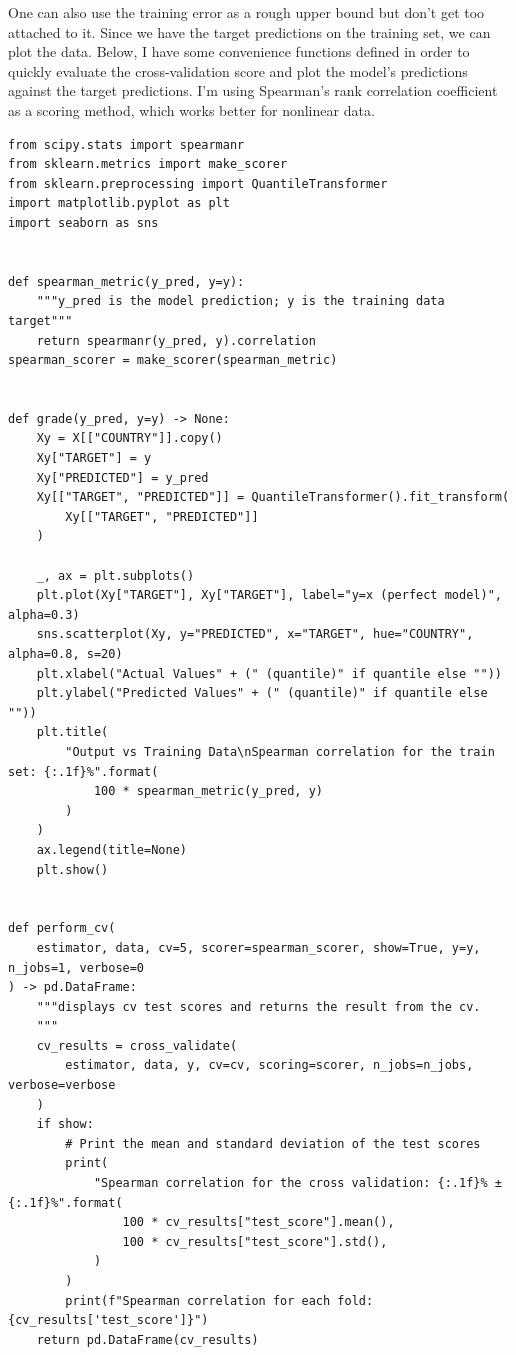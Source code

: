 \documentclass[11pt]{article}
\theoremstyle{definition}
\begin{document}
One can also use the training error as a rough upper bound but don't get too attached to it. Since we have the target predictions on the training set, we can plot the data. Below, I have some convenience functions defined in order to quickly evaluate the cross-validation score and plot the model's predictions against the target predictions. I'm using Spearman's rank correlation coefficient as a scoring method, which works better for nonlinear data.

\begin{verbatim}
from scipy.stats import spearmanr
from sklearn.metrics import make_scorer
from sklearn.preprocessing import QuantileTransformer
import matplotlib.pyplot as plt
import seaborn as sns


def spearman_metric(y_pred, y=y):
    """y_pred is the model prediction; y is the training data target"""
    return spearmanr(y_pred, y).correlation
spearman_scorer = make_scorer(spearman_metric)


def grade(y_pred, y=y) -> None:
    Xy = X[["COUNTRY"]].copy()
    Xy["TARGET"] = y
    Xy["PREDICTED"] = y_pred
    Xy[["TARGET", "PREDICTED"]] = QuantileTransformer().fit_transform(
        Xy[["TARGET", "PREDICTED"]]
    )

    _, ax = plt.subplots()
    plt.plot(Xy["TARGET"], Xy["TARGET"], label="y=x (perfect model)", alpha=0.3)
    sns.scatterplot(Xy, y="PREDICTED", x="TARGET", hue="COUNTRY", alpha=0.8, s=20)
    plt.xlabel("Actual Values" + (" (quantile)" if quantile else ""))
    plt.ylabel("Predicted Values" + (" (quantile)" if quantile else ""))
    plt.title(
        "Output vs Training Data\nSpearman correlation for the train set: {:.1f}%".format(
            100 * spearman_metric(y_pred, y)
        )
    )
    ax.legend(title=None)
    plt.show()


def perform_cv(
    estimator, data, cv=5, scorer=spearman_scorer, show=True, y=y, n_jobs=1, verbose=0
) -> pd.DataFrame:
    """displays cv test scores and returns the result from the cv.
    """
    cv_results = cross_validate(
        estimator, data, y, cv=cv, scoring=scorer, n_jobs=n_jobs, verbose=verbose
    )
    if show:
        # Print the mean and standard deviation of the test scores
        print(
            "Spearman correlation for the cross validation: {:.1f}% ± {:.1f}%".format(
                100 * cv_results["test_score"].mean(),
                100 * cv_results["test_score"].std(),
            )
        )
        print(f"Spearman correlation for each fold: {cv_results['test_score']}")
    return pd.DataFrame(cv_results)
\end{verbatim}
\end{document}
